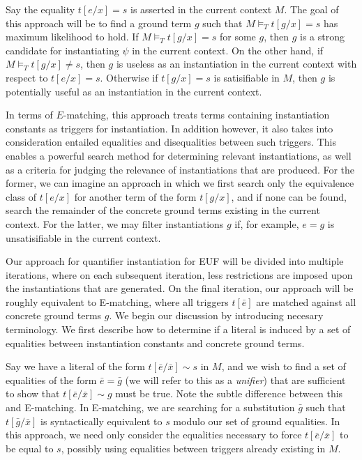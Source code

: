 \documentclass{llncs}
\begin{document}
Say the equality $t[e/x] = s$ is asserted in the current context $M$.
The goal of this approach will be to find a ground term $g$ such that $M \models_T t[g/x] = s$ has maximum likelihood to hold.
If $M \models_T t[g/x] = s$ for some $g$, then $g$ is a strong candidate for instantiating $\psi$ in the current context.
On the other hand, if $M \models_T t[g/x] \neq s$, then $g$ is useless as an instantiation in the current context with respect to $t[e/x] = s$.
Otherwise if $t[g/x] = s$ is satisifiable in $M$, then $g$ is potentially useful as an instantiation in the current context.

In terms of $E$-matching, this approach treats terms containing instantiation constants as triggers for instantiation.
In addition however, it also takes into consideration entailed equalities and disequalities between such triggers.
This enables a powerful search method for determining relevant instantiations, as well as a criteria for judging the relevance of instantiations that are produced.
For the former, we can imagine an approach in which we first search only the equivalence class of $t[e/x]$ for another term of the form $t[g/x]$, and if none can be found, search the remainder of the concrete ground terms existing in the current context.
For the latter, we may filter instantiations $g$ if, for example, $e = g$ is unsatisifiable in the current context.

Our approach for quantifier instantiation for EUF will be divided into multiple iterations, where on each subsequent iteration, less restrictions are imposed upon the instantiations that are generated.
On the final iteration, our approach will be roughly equivalent to E-matching, where all triggers $t[\bar{e}]$ are matched against all concrete ground terms $g$.
We begin our discussion by introducing necesary terminology.
We first describe how to determine if a literal is induced by a set of equalities between instantiation constants and concrete ground terms.

Say we have a literal of the form $t[\bar{e}/\bar{x}] \sim s$ in $M$, and we wish to find a set of equalities of the form $\bar{e} = \bar{g}$ (we will refer to this as a \emph{unifier}) that are sufficient to show that $t[\bar{e}/\bar{x}] \sim g$ must be true.
Note the subtle difference between this and E-matching.
In E-matching, we are searching for a substitution $\bar{g}$ such that $t[\bar{g}/\bar{x}]$ is syntactically equivalent to $s$ modulo our set of ground equalities.
In this approach, we need only consider the equalities necessary to force $t[\bar{e}/\bar{x}]$ to be equal to $s$, possibly using equalities between triggers already existing in $M$.
\end{document}
